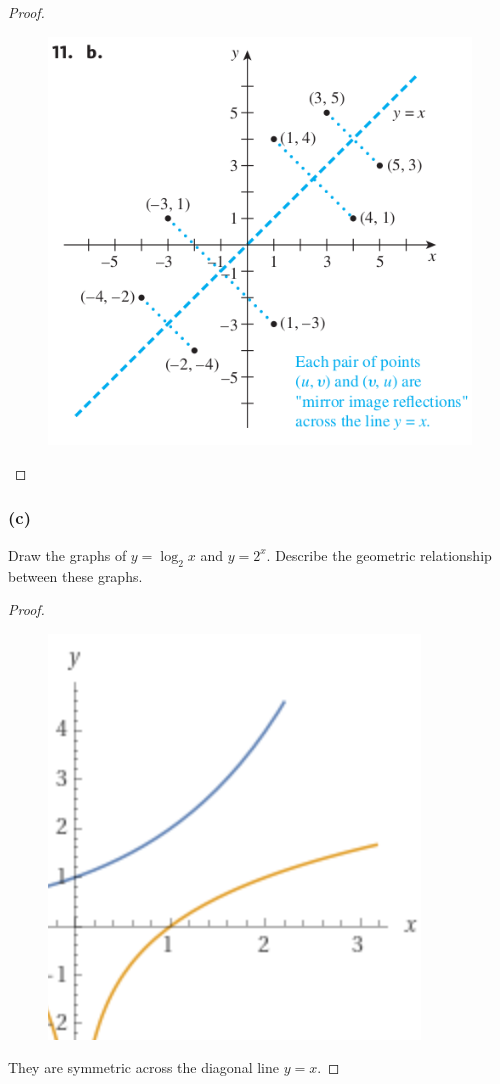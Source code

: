 \documentclass[14pt]{extarticle}
\begin{document}
\begin{proof}
\begin{figure}[ht!]
\centering
\includegraphics[scale=0.5]{../images/11.4.11.b.png}
\end{figure}
\end{proof}

\subsubsection{(c)}
Draw the graphs of \(y = \log_2 x\) and \(y = 2^x\). Describe the geometric relationship between these graphs.

\begin{proof}
\begin{figure}[ht!]
\centering
\includegraphics[scale=0.5]{../images/11.4.11.c.png}
\end{figure}

They are symmetric across the diagonal line \(y = x\).
\end{proof}
\end{document}
